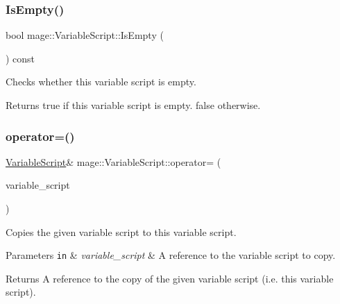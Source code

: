 \subsubsection{\texorpdfstring{Is\+Empty()}{IsEmpty()}}
{\footnotesize\ttfamily bool mage\+::\+Variable\+Script\+::\+Is\+Empty (\begin{DoxyParamCaption}{ }\end{DoxyParamCaption}) const\hspace{0.3cm}{\ttfamily [noexcept]}}

Checks whether this variable script is empty.

\begin{DoxyReturn}{Returns}
{\ttfamily true} if this variable script is empty. {\ttfamily false} otherwise. 
\end{DoxyReturn}
\hypertarget{classmage_1_1_variable_script_ae090b066ea939fc6611e77a47df6a97f}{}\label{classmage_1_1_variable_script_ae090b066ea939fc6611e77a47df6a97f} 
\subsubsection{\texorpdfstring{operator=()}{operator=()}\hspace{0.1cm}{\footnotesize\ttfamily [1/2]}}
{\footnotesize\ttfamily \hyperlink{classmage_1_1_variable_script}{Variable\+Script}\& mage\+::\+Variable\+Script\+::operator= (\begin{DoxyParamCaption}\item[{const \hyperlink{classmage_1_1_variable_script}{Variable\+Script} \&}]{variable\+\_\+script }\end{DoxyParamCaption})\hspace{0.3cm}{\ttfamily [delete]}}

Copies the given variable script to this variable script.


\begin{DoxyParams}[1]{Parameters}
\mbox{\tt in}  & {\em variable\+\_\+script} & A reference to the variable script to copy. \\
\hline
\end{DoxyParams}
\begin{DoxyReturn}{Returns}
A reference to the copy of the given variable script (i.\+e. this variable script). 
\end{DoxyReturn}
\hypertarget{classmage_1_1_variable_script_a4602887cc8b6c45a169af7822cf744a1}{}\label{classmage_1_1_variable_script_a4602887cc8b6c45a169af7822cf744a1} 
